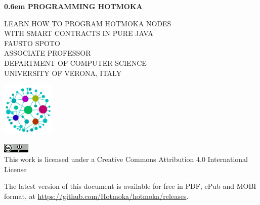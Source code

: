 \BgThispage
\newcommand\nbvspace[1][3]{\vspace*{\stretch{#1}}}
\newcommand\nbstretchyspace{\spaceskip0.5em plus 0.25em minus 0.25em}
\newcommand{\nbtitlestretch}{\spaceskip0.6em}
\pagestyle{empty}
\begin{center}
\bfseries
\nbvspace[1]
\Huge
{\nbtitlestretch\huge
PROGRAMMING HOTMOKA}

\nbvspace[1]
\normalsize

LEARN HOW TO PROGRAM HOTMOKA NODES\\
WITH SMART CONTRACTS IN PURE JAVA
\nbvspace[1]\\
\Large FAUSTO SPOTO\\[0.5em]
\footnotesize ASSOCIATE PROFESSOR\\
DEPARTMENT OF COMPUTER SCIENCE\\
UNIVERSITY OF VERONA, ITALY

\nbvspace[2]

\includegraphics[width=1in]{./pics/logo_hotmoka_minimal.png}
\nbvspace[2]
\normalsize

\nbvspace[1]
\includegraphics[width=0.5in]{./pics/CC_license.png}\\
\small
This work is licensed under a Creative Commons Attribution 4.0 International License

\end{center}

\newpage

\nbvspace[2]
The latest version of this document is available for free in PDF, ePub and MOBI format, at \url{https://github.com/Hotmoka/hotmoka/releases}.
